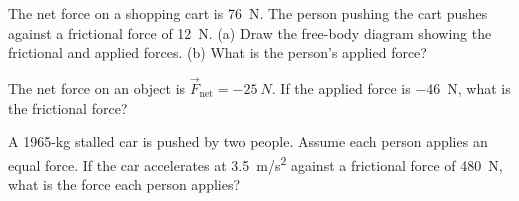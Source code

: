 \documentclass[main.tex]{subfiles}
\begin{document}
\begin{center}
\end{center}


\begin{exercise} \label{lqMcA5}
The net force on a shopping cart is \SI{76}{N}. The person pushing the cart pushes against a frictional force of \SI{12}{N}. (a) Draw the free-body diagram showing the frictional and applied forces. (b) What is the person's applied force?
\end{exercise}

\begin{exercise} \label{Og290b}
The net force on an object is $\vec{F}_{\text{net}} = \SI{-25}{N}$. If the applied force is \SI{-46}{N}, what is the frictional force? 
\end{exercise}

\begin{center}
\end{center}

\begin{exercise} \label{naDHpo}
A 1965-kg stalled car is pushed by two people. Assume each person applies an equal force. If the car accelerates at \SI{3.5}{m/s^2} against a frictional force of \SI{480}{N}, what is the force each person applies? 
\end{exercise}
\end{document}
